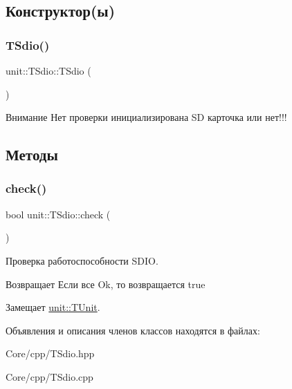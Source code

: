 \subsection{Конструктор(ы)}
\mbox{\label{classunit_1_1_t_sdio_ab772a88df605f6d22e9352d281bc7e08}} 
\subsubsection{\texorpdfstring{T\+Sdio()}{TSdio()}}
{\footnotesize\ttfamily unit\+::\+T\+Sdio\+::\+T\+Sdio (\begin{DoxyParamCaption}{ }\end{DoxyParamCaption})}

\begin{DoxyAttention}{Внимание}
Нет проверки инициализирована SD карточка или нет!!! 
\end{DoxyAttention}


\subsection{Методы}
\mbox{\label{classunit_1_1_t_sdio_a01d0b69d4bf6735a74efc1a4661289e7}} 
\subsubsection{\texorpdfstring{check()}{check()}}
{\footnotesize\ttfamily bool unit\+::\+T\+Sdio\+::check (\begin{DoxyParamCaption}{ }\end{DoxyParamCaption})\hspace{0.3cm}{\ttfamily [virtual]}}



Проверка работоспособности S\+D\+IO. 

\begin{DoxyReturn}{Возвращает}
Если все Ok, то возвращается true 
\end{DoxyReturn}


Замещает \hyperlink{classunit_1_1_t_unit_abdcc6daabc86cea10abc96593d9d2c2a}{unit\+::\+T\+Unit}.



Объявления и описания членов классов находятся в файлах\+:\begin{DoxyCompactItemize}
\item 
Core/cpp/T\+Sdio.\+hpp\item 
Core/cpp/T\+Sdio.\+cpp\end{DoxyCompactItemize}

